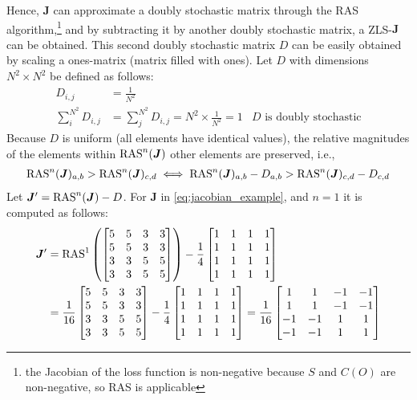 Hence, $\bm{J}$ can approximate a doubly stochastic matrix through the RAS algorithm,\footnote{the Jacobian of the loss function is non-negative because $S$ and $C(O)$ are non-negative, so RAS is applicable} and by subtracting it by another doubly stochastic matrix, a ZLS-$\bm{J}$ can be obtained. This second doubly stochastic matrix $D$ can be easily obtained by scaling a ones-matrix (matrix filled with ones). Let $D$ with dimensions $N^2\times N^2$ be defined as follows:
\begin{align}
    D_{i,j}&=\frac{1}{N^2}\nonumber\\
    \sum_i^{N^2} D_{i,j}&=\sum_j^{N^2} D_{i,j}=N^2\times \frac{1}{N^2}=1 &\text{$D$ is doubly stochastic}
    \label{eq:d_doubly_stochastic}
\end{align}
Because $D$ is uniform (all elements have identical values), the relative magnitudes of the elements within $\operatorname{RAS}^n(\bm{J})$ \wrt{} other elements are preserved, i.e.,
\begin{align}
\operatorname{RAS}^n(\bm{J})_{a,b}>\operatorname{RAS}^n(\bm{J})_{c,d} \iff \operatorname{RAS}^n(\bm{J})_{a,b}-D_{a,b}>\operatorname{RAS}^n(\bm{J})_{c,d}-D_{c,d}
\end{align}
Let $\bm{J}'=\operatorname{RAS}^n(\bm{J})-D$. For $\bm{J}$ in \autoref{eq:jacobian_example}, and $n=1$ it is computed as follows:
\begin{align}
    \bm{J}'&=\operatorname{RAS}^{1}\left(
    \begin{bmatrix}
          5&5&3&3\\
          5&5&3&3\\
          3&3&5&5\\
          3&3&5&5
      \end{bmatrix}
    \right)-
    \frac{1}{4}\begin{bmatrix}
        1&1&1&1\\
        1&1&1&1\\
        1&1&1&1\\
        1&1&1&1
    \end{bmatrix}\nonumber\\
    &=\frac{1}{16}\begin{bmatrix}
          5&5&3&3\\
          5&5&3&3\\
          3&3&5&5\\
          3&3&5&5
    \end{bmatrix}
    -\frac{1}{4}
    \begin{bmatrix}
        1&1&1&1\\
        1&1&1&1\\
        1&1&1&1\\
        1&1&1&1
    \end{bmatrix}=\frac{1}{16}
    \begin{bmatrix}
        1&1&-1&-1\\
        1&1&-1&-1\\
        -1&-1&1&1\\
        -1&-1&1&1
    \end{bmatrix}
    \label{eq:jacobian_prime}
\end{align}

